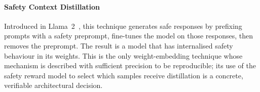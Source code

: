 \paragraph{Safety Context Distillation}
Introduced in Llama~2~\cite{touvron2023llama2}, this technique generates safe
responses by prefixing prompts with a safety preprompt, fine-tunes the model on
those responses, then removes the preprompt.
The result is a model that has internalised safety behaviour in its weights.
This is the only weight-embedding technique whose mechanism is described with
sufficient precision to be reproducible; its use of the safety reward model to
select which samples receive distillation is a concrete, verifiable architectural
decision.
